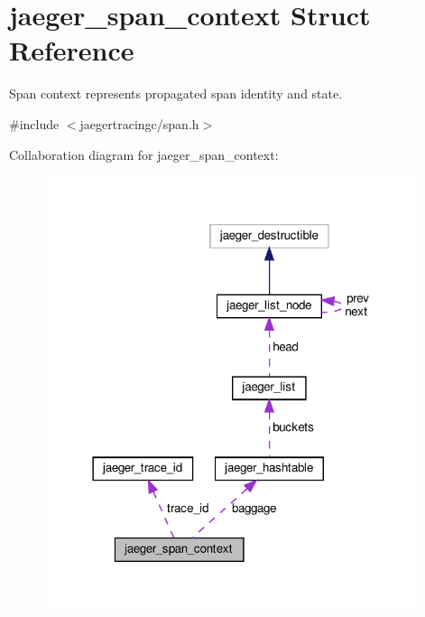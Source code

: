 \hypertarget{structjaeger__span__context}{}\section{jaeger\+\_\+span\+\_\+context Struct Reference}
\label{structjaeger__span__context}


Span context represents propagated span identity and state.  




{\ttfamily \#include $<$jaegertracingc/span.\+h$>$}



Collaboration diagram for jaeger\+\_\+span\+\_\+context\+:\nopagebreak
\begin{figure}[H]
\begin{center}
\leavevmode
\includegraphics[width=310pt]{structjaeger__span__context__coll__graph}
\end{center}
\end{figure}

